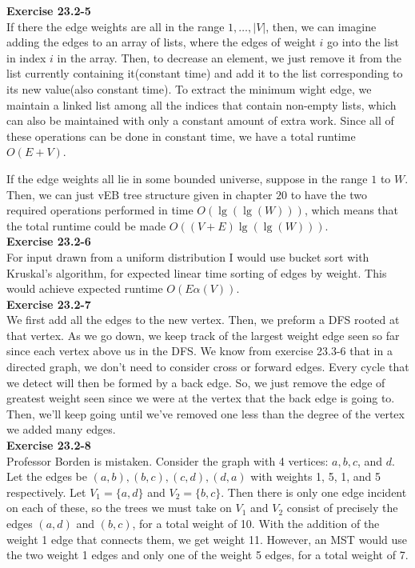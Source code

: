 \documentclass{article}
\begin{document}
\noindent\textbf{Exercise 23.2-5}\\

If there the edge weights are all in the range $1,\ldots, |V|$, then, we can imagine adding the edges to an array of lists, where the edges of weight $i$ go into the list in index $i$ in the array. Then, to decrease an element, we just remove it from the list currently containing it(constant time) and add it to the list corresponding to its new value(also constant time). To extract the minimum wight edge, we maintain a linked list among all the indices that contain non-empty lists, which can also be maintained with only a constant amount of extra work. Since all of these operations can be done in constant time, we have a total runtime $O(E+V)$.

If the edge weights all lie in some bounded universe, suppose in the range $1$ to $W$. Then, we can just vEB tree structure given in chapter $20$ to have the two required operations performed in time $O(\lg(\lg(W)))$, which means that the total runtime could be made $O((V+E)\lg(\lg(W)))$.\\

\noindent\textbf{Exercise 23.2-6}\\

For input drawn from a uniform distribution I would use bucket sort with Kruskal's algorithm, for expected linear time sorting of edges by weight.  This would achieve expected runtime $O(E\alpha(V))$. \\

\noindent\textbf{Exercise 23.2-7}\\
We first add all the edges to the new vertex. Then, we preform a DFS rooted at that vertex. As we go down, we keep track of the largest weight edge seen so far since each vertex above us in the DFS. We know from exercise 23.3-6 that in a directed graph, we don't need to consider cross or forward edges. Every cycle that we detect will then be formed by a back edge. So, we just remove the edge of greatest weight seen since we were at the vertex that the back edge is going to. Then, we'll keep going until we've removed one less than the degree of the vertex we added many edges.\\
\noindent\textbf{Exercise 23.2-8}\\

Professor Borden is mistaken.  Consider the graph with 4 vertices: $a, b, c$, and $d$.  Let the edges be $(a,b), (b,c), (c,d), (d,a)$ with weights 1, 5, 1, and 5 respectively.  Let $V_1 = \{a,d\}$ and $V_2 = \{b,c\}$.  Then there is only one edge incident on each of these, so the trees we must take on $V_1$ and $V_2$ consist of precisely the edges $(a,d)$ and $(b,c)$, for a total weight of 10.  With the addition of the weight 1 edge that connects them, we get weight 11.  However, an MST would use the two weight 1 edges and only one of the weight 5 edges, for a total weight of 7. \\
\end{document}

